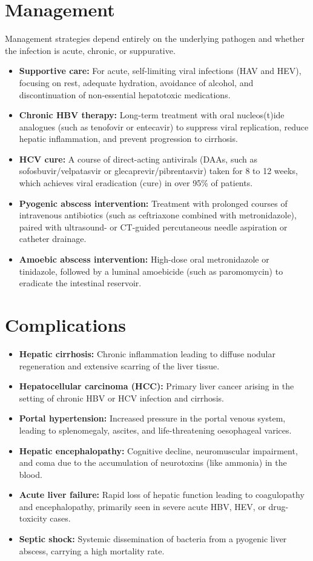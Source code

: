 \section*{Management}
Management strategies depend entirely on the underlying pathogen and whether the infection is acute, chronic, or suppurative.
\begin{itemize}
    \item \textbf{Supportive care:} For acute, self-limiting viral infections (HAV and HEV), focusing on rest, adequate hydration, avoidance of alcohol, and discontinuation of non-essential hepatotoxic medications.
    \item \textbf{Chronic HBV therapy:} Long-term treatment with oral nucleos(t)ide analogues (such as tenofovir or entecavir) to suppress viral replication, reduce hepatic inflammation, and prevent progression to cirrhosis.
    \item \textbf{HCV cure:} A course of direct-acting antivirals (DAAs, such as sofosbuvir/velpatasvir or glecaprevir/pibrentasvir) taken for 8 to 12 weeks, which achieves viral eradication (cure) in over 95\% of patients.
    \item \textbf{Pyogenic abscess intervention:} Treatment with prolonged courses of intravenous antibiotics (such as ceftriaxone combined with metronidazole), paired with ultrasound- or CT-guided percutaneous needle aspiration or catheter drainage.
    \item \textbf{Amoebic abscess intervention:} High-dose oral metronidazole or tinidazole, followed by a luminal amoebicide (such as paromomycin) to eradicate the intestinal reservoir.
\end{itemize}

\section*{Complications}
\begin{itemize}
    \item \textbf{Hepatic cirrhosis:} Chronic inflammation leading to diffuse nodular regeneration and extensive scarring of the liver tissue.
    \item \textbf{Hepatocellular carcinoma (HCC):} Primary liver cancer arising in the setting of chronic HBV or HCV infection and cirrhosis.
    \item \textbf{Portal hypertension:} Increased pressure in the portal venous system, leading to splenomegaly, ascites, and life-threatening oesophageal varices.
    \item \textbf{Hepatic encephalopathy:} Cognitive decline, neuromuscular impairment, and coma due to the accumulation of neurotoxins (like ammonia) in the blood.
    \item \textbf{Acute liver failure:} Rapid loss of hepatic function leading to coagulopathy and encephalopathy, primarily seen in severe acute HBV, HEV, or drug-toxicity cases.
    \item \textbf{Septic shock:} Systemic dissemination of bacteria from a pyogenic liver abscess, carrying a high mortality rate.
\end{itemize}

